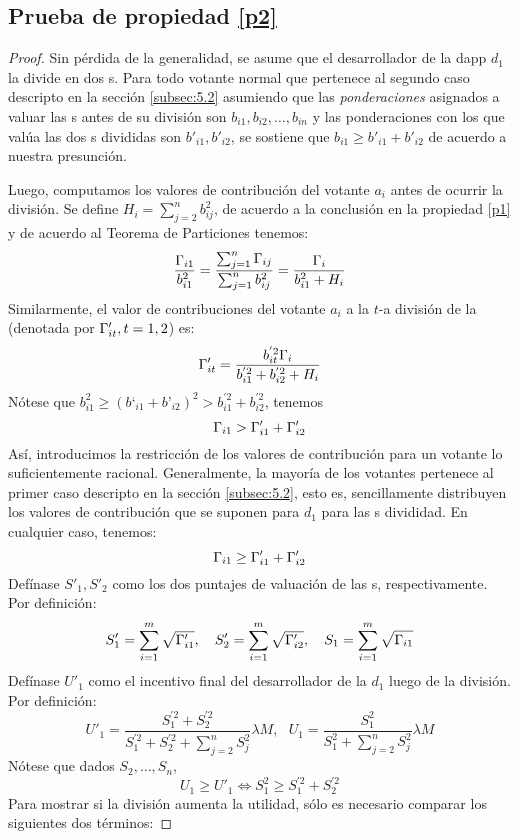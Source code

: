 \subsection{Prueba de propiedad \ref{p2}}
\label{subsection:proof2}
\begin{proof}
	Sin pérdida de la generalidad, se asume que el desarrollador de la dapp $d_1$ la divide en dos {\dapp}s. Para todo votante normal que pertenece al segundo caso descripto en la sección \ref{subsec:5.2} asumiendo que las \textit{ponderaciones} asignados a valuar las
	{\dapp}s antes de su división son $b_{i1},b_{i2},\ldots,b_{in}$ y las ponderaciones con los que valúa las dos {\dapp}s divididas son $b'_{i1},b'_{i2}$, se sostiene que $b_{i1} \geq b'_{i1}+b'_{i2}$ de acuerdo a nuestra presunción.

	Luego, computamos los valores de contribución del votante $a_i$ antes de ocurrir la división. Se define $H_i = \sum_{j=2}^n b_{ij}^2$, de acuerdo a la conclusión en la propiedad \ref{p1} y de acuerdo al Teorema de Particiones tenemos:
		 $$\frac{\Gamma_{i1}}{b_{i1}^2} = \frac{\sum_{j=1}^n \Gamma_{ij}}{\sum_{j=1}^n b_{ij}^2} = \frac{\Gamma_i}{b_{i1}^2+H_i}$$
  Similarmente, el valor de contribuciones del votante $a_i$ a la $t$-a división de la \dapp (denotada por $\Gamma'_{it},t=1,2$) es:
  	 $$\Gamma'_{it} =  \frac{b_{it}^{'2}\Gamma_i}{b_{i1}^{'2}+b_{i2}^{'2}+H_i}$$
  	 Nótese que $b_{i1}^2 \geq (b‘_{i1}+b’_{i2})^2 >b_{i1}^{'2}+b_{i2}^{'2}$, tenemos
  	 $$\Gamma_{i1} > \Gamma'_{i1}+\Gamma'_{i2}$$
  	 Así, introducimos la restricción de los valores de contribución para un votante lo suficientemente racional. Generalmente, la mayoría de los votantes pertenece al primer caso descripto en la sección \ref{subsec:5.2}, esto es, sencillamente distribuyen los valores de contribución que se suponen para $d_1$ para las {\dapp}s divididad. En cualquier caso, tenemos:
  	 	 	$$\Gamma_{i1} \geq \Gamma'_{i1}+\Gamma'_{i2}$$
  	 Defínase $S'_1,S'_2$ como los dos puntajes de valuación de las {\dapp}s, respectivamente. Por definición:
  	 	 $$S'_1 =  \sum_{i=1}^m \sqrt{\Gamma'_{i1}},~~~S'_2 =  \sum_{i=1}^m \sqrt{\Gamma'_{i2}},~~~S_1 = \sum_{i=1}^m \sqrt{\Gamma_{i1}}$$
  	Defínase $U'_1$ como el incentivo final del desarrollador de la \dapp $d_1$ luego de la división. Por definición:
  		 $$U'_1=\frac{S_1^{'2}+S_2^{'2}}{S_1^{'2}+S_2^{'2}+\sum_{j=2}^n S_j^2} \lambda M,~~~U_1=\frac{S^2_1}{S_1^2+\sum_{j=2}^n S_j^2} \lambda M$$
  	Nótese que dados $S_2,\ldots,S_n$,
  		 $$ U_1 \geq U'_1 \Leftrightarrow S_1^2 \geq S_1^{'2}+S_2^{'2}$$
   Para mostrar si la división aumenta la utilidad, sólo es necesario comparar los siguientes dos términos:

\end{proof}
